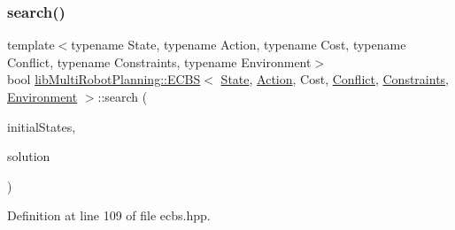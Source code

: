 \subsubsection{\texorpdfstring{search()}{search()}}
{\footnotesize\ttfamily template$<$typename State, typename Action, typename Cost, typename Conflict, typename Constraints, typename Environment$>$ \\
bool \hyperlink{classlib_multi_robot_planning_1_1_e_c_b_s}{lib\+Multi\+Robot\+Planning\+::\+E\+C\+BS}$<$ \hyperlink{structlib_multi_robot_planning_1_1_state}{State}, \hyperlink{namespacelib_multi_robot_planning_aba73fb71693f86a324adfa0e41e1053d}{Action}, Cost, \hyperlink{structlib_multi_robot_planning_1_1_conflict}{Conflict}, \hyperlink{structlib_multi_robot_planning_1_1_constraints}{Constraints}, \hyperlink{classlib_multi_robot_planning_1_1_environment}{Environment} $>$\+::search (\begin{DoxyParamCaption}\item[{const std\+::vector$<$ \hyperlink{structlib_multi_robot_planning_1_1_state}{State} $>$ \&}]{initial\+States,  }\item[{std\+::vector$<$ \hyperlink{structlib_multi_robot_planning_1_1_plan_result}{Plan\+Result}$<$ \hyperlink{structlib_multi_robot_planning_1_1_state}{State}, \hyperlink{namespacelib_multi_robot_planning_aba73fb71693f86a324adfa0e41e1053d}{Action}, Cost $>$ $>$ \&}]{solution }\end{DoxyParamCaption})\hspace{0.3cm}{\ttfamily [inline]}}



Definition at line 109 of file ecbs.\+hpp.

